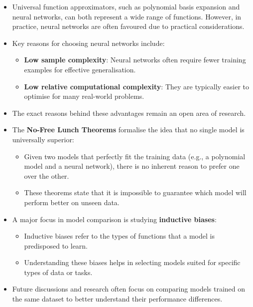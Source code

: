 \begin{itemize}
    \item Universal function approximators, such as polynomial basis expansion and neural networks, can both represent a wide range of functions. However, in practice, neural networks are often favoured due to practical considerations.
    \item Key reasons for choosing neural networks include:
          \begin{itemize}
              \item \textbf{Low sample complexity}: Neural networks often require fewer training examples for effective generalisation.
              \item \textbf{Low relative computational complexity}: They are typically easier to optimise for many real-world problems.
          \end{itemize}
    \item The exact reasons behind these advantages remain an open area of research.
    \item The \textbf{No-Free Lunch Theorems} formalise the idea that no single model is universally superior:
          \begin{itemize}
              \item Given two models that perfectly fit the training data (e.g., a polynomial model and a neural network), there is no inherent reason to prefer one over the other.
              \item These theorems state that it is impossible to guarantee which model will perform better on unseen data.
          \end{itemize}
    \item A major focus in model comparison is studying \textbf{inductive biases}:
          \begin{itemize}
              \item Inductive biases refer to the types of functions that a model is predisposed to learn.
              \item Understanding these biases helps in selecting models suited for specific types of data or tasks.
          \end{itemize}
    \item Future discussions and research often focus on comparing models trained on the same dataset to better understand their performance differences.
\end{itemize}



